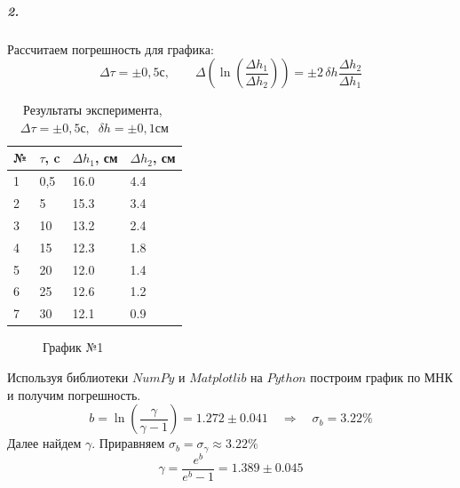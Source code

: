 \documentclass[a4paper,12pt]{article}
\begin{document}
	\subparagraph*{2.} Рассчитаем погрешность для графика: $$\Delta \tau = \pm0,5 с, \qquad \Delta\left(\ln\left(\dfrac{\Delta h_1}{\Delta h_2}\right)\right) = \pm2\,\delta h\dfrac{\Delta h_2}{\Delta h_1}$$
	\begin{table}[h!] 
		\caption{Результаты эксперимента,$\;$ $\Delta \tau = \pm0,5 с,\;\; \delta h = \pm0,1 см$}
		\begin{center}
			\begin{tabular}{|*{4}{l|}}
				\hline
				№ & $\tau$, c & $\Delta h_1$, см & $\Delta h_2$, см\\ \hline
				1 & 0,5 & 16.0 & 4.4 \\ \hline
				2 & 5 & 15.3 & 3.4 \\ \hline
				3 & 10 & 13.2 & 2.4 \\ \hline
				4 & 15 & 12.3 & 1.8 \\ \hline
				5 & 20 & 12.0 & 1.4 \\ \hline 
				6 & 25 & 12.6 & 1.2 \\ \hline
				7 & 30 & 12.1 & 0.9 \\ \hline 
			\end{tabular}
		\end{center}
	\end{table}
	
	\begin{figure}[h!]
		\caption[]{\label{fig:2} График №1}
	\end{figure}

	Используя библиотеки $NumPy$ и $Matplotlib$ на $Python$ построим график по МНК и получим погрешность. 
	\begin{equation*}
		b = \ln\left(\dfrac{\gamma}{\gamma - 1}\right) = 1.272 \pm 0.041\quad \Rightarrow \quad \sigma_b = 3.22\% 
	\end{equation*}
	Далее найдем $\gamma$. Приравняем $\sigma_b = \sigma_{\gamma} \approx 3.22\%$ 
	\begin{equation*}
		\gamma = \dfrac{e^b}{e^b - 1} = 1.389 \pm 0.045
	\end{equation*}
\end{document}

